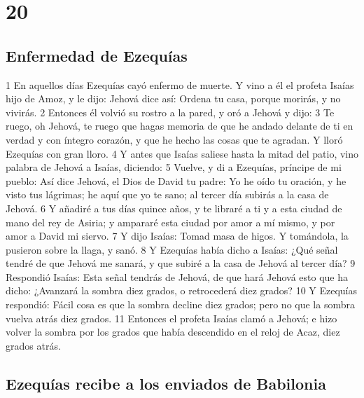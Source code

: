 \chapter{20}

\section*{Enfermedad de Ezequías}

 

1 En aquellos días Ezequías cayó enfermo de muerte. Y vino a él el profeta Isaías hijo de Amoz, y le dijo: Jehová dice así: Ordena tu casa, porque morirás, y no vivirás.
2 Entonces él volvió su rostro a la pared, y oró a Jehová y dijo:
3 Te ruego, oh Jehová, te ruego que hagas memoria de que he andado delante de ti en verdad y con íntegro corazón, y que he hecho las cosas que te agradan. Y lloró Ezequías con gran lloro.
4 Y antes que Isaías saliese hasta la mitad del patio, vino palabra de Jehová a Isaías, diciendo:
5 Vuelve, y di a Ezequías, príncipe de mi pueblo: Así dice Jehová, el Dios de David tu padre: Yo he oído tu oración, y he visto tus lágrimas; he aquí que yo te sano; al tercer día subirás a la casa de Jehová. 
6 Y añadiré a tus días quince años, y te libraré a ti y a esta ciudad de mano del rey de Asiria; y ampararé esta ciudad por amor a mí mismo, y por amor a David mi siervo.
7 Y dijo Isaías: Tomad masa de higos. Y tomándola, la pusieron sobre la llaga, y sanó.
8 Y Ezequías había dicho a Isaías: ¿Qué señal tendré de que Jehová me sanará, y que subiré a la casa de Jehová al tercer día?
9 Respondió Isaías: Esta señal tendrás de Jehová, de que hará Jehová esto que ha dicho: ¿Avanzará la sombra diez grados, o retrocederá diez grados?
10 Y Ezequías respondió: Fácil cosa es que la sombra decline diez grados; pero no que la sombra vuelva atrás diez grados.
11 Entonces el profeta Isaías clamó a Jehová; e hizo volver la sombra por los grados que había descendido en el reloj de Acaz, diez grados atrás.
\section*{Ezequías recibe a los enviados de Babilonia}


